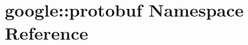 \hypertarget{namespacegoogle_1_1protobuf}{
\section{google::protobuf Namespace Reference}
\label{namespacegoogle_1_1protobuf}
}
